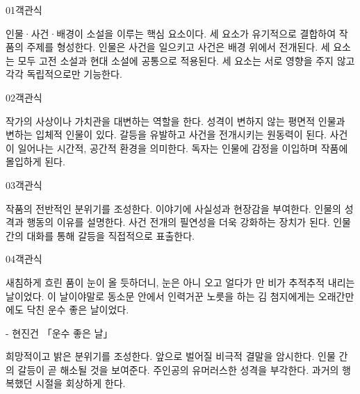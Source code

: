 \documentclass[fs9,seriesRus]{korfarm-base}
\begin{document}

\par\medskip
\kfBeginMC
\begin{kfQBlock}{01}{객관식}
\begin{kfChoices}
\kfChoice 인물·사건·배경이 소설을 이루는 핵심 요소이다.
\kfChoice 세 요소가 유기적으로 결합하여 작품의 주제를 형성한다.
\kfChoice 인물은 사건을 일으키고 사건은 배경 위에서 전개된다.
\kfChoice 세 요소는 모두 고전 소설과 현대 소설에 공통으로 적용된다.
\kfChoice 세 요소는 서로 영향을 주지 않고 각각 독립적으로만 기능한다.
\end{kfChoices}
\end{kfQBlock}
\begin{kfQBlock}{02}{객관식}
\begin{kfChoices}
\kfChoice 작가의 사상이나 가치관을 대변하는 역할을 한다.
\kfChoice 성격이 변하지 않는 평면적 인물과 변하는 입체적 인물이 있다.
\kfChoice 갈등을 유발하고 사건을 전개시키는 원동력이 된다.
\kfChoice 사건이 일어나는 시간적, 공간적 환경을 의미한다.
\kfChoice 독자는 인물에 감정을 이입하며 작품에 몰입하게 된다.
\end{kfChoices}
\end{kfQBlock}
\begin{kfQBlock}{03}{객관식}
\begin{kfChoices}
\kfChoice 작품의 전반적인 분위기를 조성한다.
\kfChoice 이야기에 사실성과 현장감을 부여한다.
\kfChoice 인물의 성격과 행동의 이유를 설명한다.
\kfChoice 사건 전개의 필연성을 더욱 강화하는 장치가 된다.
\kfChoice 인물 간의 대화를 통해 갈등을 직접적으로 표출한다.
\end{kfChoices}
\end{kfQBlock}
\begin{kfQBlock}{04}{객관식}
\begin{kfEvidence}새침하게 흐린 품이 눈이 올 듯하더니, 눈은 아니 오고 얼다가 만 비가 추적추적 내리는 날이었다. 이 날이야말로 동소문 안에서 인력거꾼 노릇을 하는 김 첨지에게는 오래간만에도 닥친 운수 좋은 날이었다.

- 현진건 「운수 좋은 날」\end{kfEvidence}
\begin{kfChoices}
\kfChoice 희망적이고 밝은 분위기를 조성한다.
\kfChoice 앞으로 벌어질 비극적 결말을 암시한다.
\kfChoice 인물 간의 갈등이 곧 해소될 것을 보여준다.
\kfChoice 주인공의 유머러스한 성격을 부각한다.
\kfChoice 과거의 행복했던 시절을 회상하게 한다.
\end{kfChoices}
\end{kfQBlock}
\end{document}

